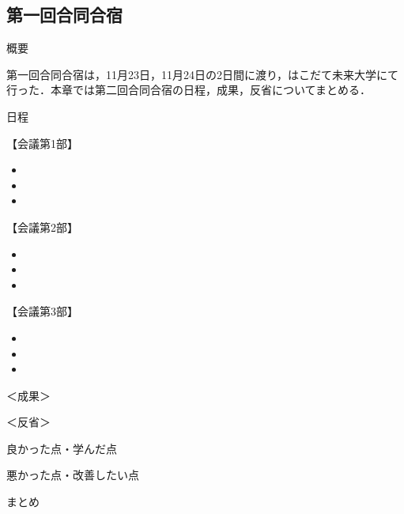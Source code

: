 \subsection{第一回合同合宿}
\par
概要
\par 
第一回合同合宿は，11月23日，11月24日の2日間に渡り，はこだて未来大学にて行った．本章では第二回合同合宿の日程，成果，反省についてまとめる．
\par
日程
\par
【会議第1部】
\begin{itemize}
\item 
\item 
\item 
\end{itemize}
【会議第2部】
\begin{itemize}
\item 
\item 
\item 
\end{itemize}
【会議第3部】
\begin{itemize}
\item 
\item 
\item 
\end{itemize}
＜成果＞
\par  
\par
＜反省＞
\par

\par
良かった点・学んだ点
\begin{itemize}

\end{itemize}
\par
悪かった点・改善したい点
\begin{itemize}

\end{itemize}
\par
まとめ
\par

